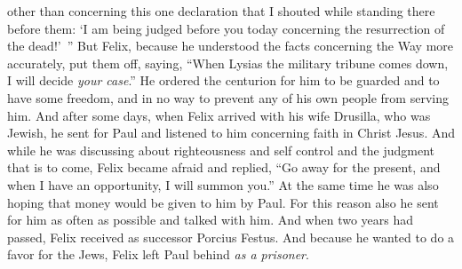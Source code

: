 \begin{biblechapter}
\verse other than concerning this one declaration that I shouted while standing there before them: ‘I am being judged before you today concerning the resurrection of the dead!’ ”
 But Felix, because he understood the facts concerning the Way more accurately, put them off, saying, “When Lysias the military tribune comes down, I will decide \textit{your case}.”
\verse He ordered the centurion for him to be guarded and to have some freedom, and in no way to prevent any of his own people from serving him.
\verse And after some days, when Felix arrived with his wife Drusilla, who was Jewish, he sent for Paul and listened to him concerning faith in Christ Jesus.
\verse And while he was discussing about righteousness and self control and the judgment that is to come, Felix became afraid and replied, “Go away for the present, and when I have an opportunity, I will summon you.”
\verse At the same time he was also hoping that money would be given to him by Paul. For this reason also he sent for him as often as possible and talked with him.
\verse And when two years had passed, Felix received as successor Porcius Festus. And because he wanted to do a favor for the Jews, Felix left Paul behind \textit{as a prisoner}.
\end{biblechapter}

